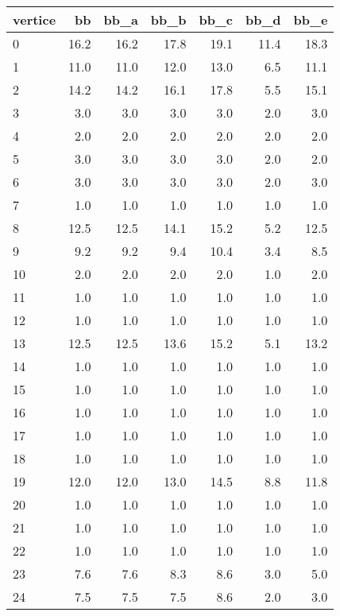 \begin{tabular}{lrrrrrr}
\toprule
vertice &    bb &  bb\_a &  bb\_b &  bb\_c &  bb\_d &  bb\_e \\
\midrule
      0 &  16.2 &  16.2 &  17.8 &  19.1 &  11.4 &  18.3 \\
      1 &  11.0 &  11.0 &  12.0 &  13.0 &   6.5 &  11.1 \\
      2 &  14.2 &  14.2 &  16.1 &  17.8 &   5.5 &  15.1 \\
      3 &   3.0 &   3.0 &   3.0 &   3.0 &   2.0 &   3.0 \\
      4 &   2.0 &   2.0 &   2.0 &   2.0 &   2.0 &   2.0 \\
      5 &   3.0 &   3.0 &   3.0 &   3.0 &   2.0 &   2.0 \\
      6 &   3.0 &   3.0 &   3.0 &   3.0 &   2.0 &   3.0 \\
      7 &   1.0 &   1.0 &   1.0 &   1.0 &   1.0 &   1.0 \\
      8 &  12.5 &  12.5 &  14.1 &  15.2 &   5.2 &  12.5 \\
      9 &   9.2 &   9.2 &   9.4 &  10.4 &   3.4 &   8.5 \\
     10 &   2.0 &   2.0 &   2.0 &   2.0 &   1.0 &   2.0 \\
     11 &   1.0 &   1.0 &   1.0 &   1.0 &   1.0 &   1.0 \\
     12 &   1.0 &   1.0 &   1.0 &   1.0 &   1.0 &   1.0 \\
     13 &  12.5 &  12.5 &  13.6 &  15.2 &   5.1 &  13.2 \\
     14 &   1.0 &   1.0 &   1.0 &   1.0 &   1.0 &   1.0 \\
     15 &   1.0 &   1.0 &   1.0 &   1.0 &   1.0 &   1.0 \\
     16 &   1.0 &   1.0 &   1.0 &   1.0 &   1.0 &   1.0 \\
     17 &   1.0 &   1.0 &   1.0 &   1.0 &   1.0 &   1.0 \\
     18 &   1.0 &   1.0 &   1.0 &   1.0 &   1.0 &   1.0 \\
     19 &  12.0 &  12.0 &  13.0 &  14.5 &   8.8 &  11.8 \\
     20 &   1.0 &   1.0 &   1.0 &   1.0 &   1.0 &   1.0 \\
     21 &   1.0 &   1.0 &   1.0 &   1.0 &   1.0 &   1.0 \\
     22 &   1.0 &   1.0 &   1.0 &   1.0 &   1.0 &   1.0 \\
     23 &   7.6 &   7.6 &   8.3 &   8.6 &   3.0 &   5.0 \\
     24 &   7.5 &   7.5 &   7.5 &   8.6 &   2.0 &   3.0 \\

\end{tabular}
